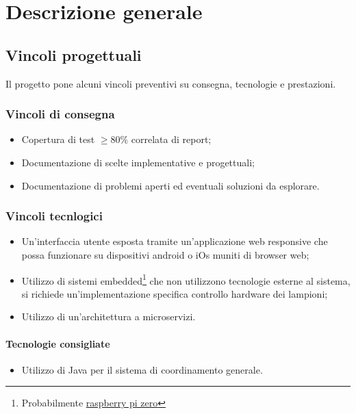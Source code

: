 \chapter{Descrizione generale}

\section{Vincoli progettuali}

Il progetto pone alcuni vincoli preventivi su consegna, tecnologie e prestazioni.

\subsection{Vincoli di consegna}
\begin{itemize}
    \item Copertura di test $\geq 80\%$ correlata di report;
    \item Documentazione di scelte implementative e progettuali;
    \item Documentazione di problemi aperti ed eventuali soluzioni da esplorare.
\end{itemize}



\subsection{Vincoli tecnlogici}
\begin{itemize}
    \item Un'interfaccia utente esposta tramite un'applicazione web responsive che possa funzionare su dispositivi android o iOs muniti di browser web;
    \item Utilizzo di sistemi embedded\footnote{Probabilmente \href{https://www.raspberrypi.com/products/raspberry-pi-zero-w/}{raspberry pi zero}} che non utilizzono tecnologie esterne al sistema, si richiede un'implementazione specifica controllo hardware dei lampioni;
    \item Utilizzo di un'architettura a microservizi.
\end{itemize}

\subsubsection{Tecnologie consigliate}

\begin{itemize}
    \item Utilizzo di Java per il sistema di coordinamento generale.
\end{itemize}

